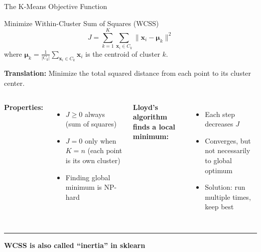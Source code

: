 \documentclass[8pt,aspectratio=169]{beamer}
\newcommand{\bottomnote}[1]{%
\vfill
\vspace{-2mm}
\textcolor{mllavender2}{\rule{\textwidth}{0.4pt}}
\vspace{1mm}
\footnotesize
\textbf{#1}
}
\newenvironment{compactlist}{%
  \begin{itemize}%
    \setlength{\itemsep}{2pt}%
    \setlength{\parskip}{0pt}%
    \setlength{\parsep}{0pt}%
}{%
  \end{itemize}%
}
\newcommand{\highlight}[1]{\textcolor{mlorange}{\textbf{#1}}}
\begin{document}
\begin{frame}[t]{The K-Means Objective Function}
\begin{block}{Minimize Within-Cluster Sum of Squares (WCSS)}
\[
J = \sum_{k=1}^{K} \sum_{\mathbf{x}_i \in C_k} \|\mathbf{x}_i - \boldsymbol{\mu}_k\|^2
\]
where $\boldsymbol{\mu}_k = \frac{1}{|C_k|}\sum_{\mathbf{x}_i \in C_k} \mathbf{x}_i$ is the centroid of cluster $k$.
\end{block}

\vspace{3mm}
\footnotesize
\highlight{Translation:} Minimize the total squared distance from each point to its cluster center.

\vspace{2mm}
\begin{columns}[T]
\textbf{Properties:}
\begin{compactlist}
\item \footnotesize $J \geq 0$ always (sum of squares)
\item \footnotesize $J = 0$ only when $K = n$ (each point is its own cluster)
\item \footnotesize Finding global minimum is NP-hard
\end{compactlist}

\textbf{Lloyd's algorithm finds a local minimum:}
\begin{compactlist}
\item \footnotesize Each step decreases $J$
\item \footnotesize Converges, but not necessarily to global optimum
\item \footnotesize Solution: run multiple times, keep best
\end{compactlist}
\end{columns}
\bottomnote{WCSS is also called ``inertia'' in sklearn}
\end{frame}
\end{document}
